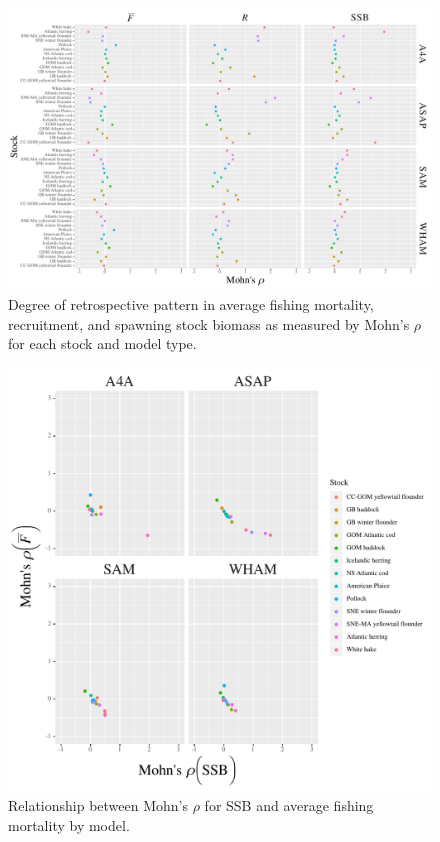 \documentclass[12pt,letterpaper, leqno]{article}
\begin{document}
\begin{landscape}
\begin{figure}
\caption{Degree of retrospective pattern in average fishing mortality, recruitment, and spawning stock biomass as measured by Mohn's $\rho$ for each stock and model type.}\label{rho_paper_plot}
\begin{center}
\includegraphics[height = 0.9\textheight]{../db/rho_paper_plot.pdf}
\end{center}
\end{figure}

\begin{figure}
\caption{Relationship between Mohn's $\rho$ for SSB and average fishing mortality by model.}\label{rho_ssb_vs_F}
\begin{center}
\includegraphics[height = 0.9\textheight]{../db/SSBvsFbarMohnRho_paper.pdf}
\end{center}
\end{figure}


\end{landscape}
\end{document}
